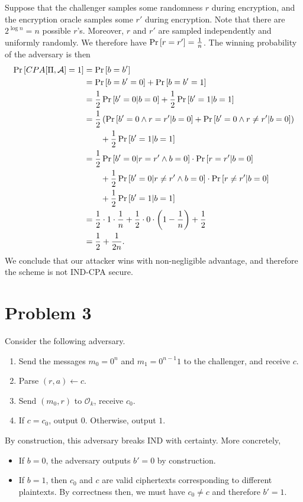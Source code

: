 \documentclass{article}
\theoremstyle{definition}
\begin{document}
Suppose that the challenger samples some randomness $r$ during encryption, and the encryption oracle samples some $r'$ during encryption.
Note that there are $2^{\log n} = n$ possible $r$'s.
Moreover, $r$ and $r'$ are sampled independently and uniformly randomly.
We therefore have $\Pr\left[r=r'\right]=\frac{1}{n}$.
The winning probability of the adversary is then
\begin{align*}
    \Pr\left[CPA[\Pi, \mathcal{A}] = 1\right] &= \Pr\left[b = b'\right] \\
    &=\Pr\left[b = b' = 0\right] + \Pr\left[b = b' = 1\right] \\
    &=\frac{1}{2} \Pr\left[b' = 0 | b = 0\right] + \frac{1}{2}\Pr\left[b' = 1 | b = 1\right] \\
    &=\frac{1}{2} \left(\Pr\left[b'=0 \wedge r=r' | b=0\right] + \Pr\left[b'=0 \wedge r\ne r' | b=0\right]\right) \\
    &\qquad + \frac{1}{2}\Pr\left[b' = 1 | b = 1\right]\\
    &= \frac{1}{2} \Pr\left[b'=0 | r=r' \wedge b=0\right]\cdot \Pr\left[r=r' | b=0\right] \\
    &\qquad + \frac{1}{2} \Pr\left[b'=0 | r\ne r' \wedge b=0\right]\cdot \Pr\left[r\ne r' | b=0\right] \\
    &\qquad + \frac{1}{2}\Pr\left[b' = 1 | b = 1\right] \\
    &=\frac{1}{2}\cdot1\cdot \frac{1}{n} + \frac{1}{2}\cdot 0\cdot \left(1-\frac{1}{n}\right) + \frac{1}{2} \\
    &= \frac{1}{2} + \frac{1}{2n}.
\end{align*}
We conclude that our attacker wins with non-negligible advantage, and therefore the scheme is not IND-CPA secure.

\section*{Problem 3}

Consider the following adversary.
\begin{enumerate}
    \item Send the messages $m_0=0^n$ and $m_1=0^{n-1}1$ to the challenger, and receive $c$.
    \item Parse $(r, a)\gets c$.
    \item Send $(m_0, r)$ to $\mathcal{O}_k$, receive $c_0$.
    \item If $c=c_0$, output $0$. Otherwise, output $1$.
\end{enumerate}
By construction, this adversary breaks IND with certainty.
More concretely, \begin{itemize}
    \item If $b=0$, the adversary outputs $b'=0$ by construction.
    \item If $b=1$, then $c_0$ and $c$ are valid ciphertexts corresponding to different plaintexts.
    By correctness then, we must have $c_0\ne c$ and therefore $b'=1$.
\end{itemize}
\end{document}
